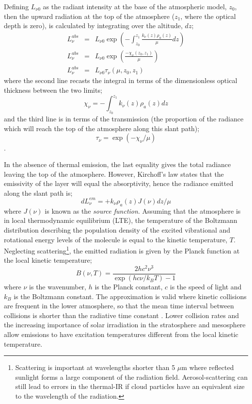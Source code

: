 \documentclass[final,5p,times,twocolumn,authoryear]{elsarticle}
\begin{document}
Defining $L_{\nu0}$ as the radiant intensity at the base of the atmospheric model, $z_0$, then the upward radiation at the top of the atmosphere ($z_1$, where the optical depth is zero), is calculated by integrating over the altitude, $dz$;
\begin{eqnarray}
L_{\nu}^{abs}&=&L_{\nu0}\exp\left(-\int_{z_0}^{z_1}\frac{k_\nu(z)\rho_a(z)}{\mu}dz\right) \\
L_{\nu}^{abs}&=&L_{\nu0}\exp\left(\frac{-\chi_\nu(z_0,z_1)}{\mu}\right) \\
L_{\nu}^{abs}&=&L_{\nu0}\tau_\nu(\mu,z_0,z_1)
\label{eq:abs_rad}
\end{eqnarray}
where the second line recasts the integral in terms of the dimensionless optical thickness between the two limits;
\begin{equation}
\chi_{\nu}=-\int_{z_0}^{z_1}k_\nu(z)\rho_a(z) dz
\end{equation}
and the third line is in terms of the transmission (the proportion of the radiance which will reach the top of the atmosphere along this slant path);
\begin{equation}
\tau_\nu=\exp(-\chi_\nu/\mu)
\end{equation}.

In the absence of thermal emission, the last equality gives the total radiance leaving the top of the atmosphere.  However, Kirchoff's law states that the emissivity of the layer will equal the absorptivity, hence the radiance emitted along the slant path is;
\begin{equation}
dL_{\nu}^{em}=+k_{\nu}\rho_a(z)J(\nu)dz/\mu
\label{eq:emm_rad}
\end{equation}
where $J(\nu)$ is known as the \textit{source function}.  Assuming that the atmosphere is in local thermodynamic equilibrium (LTE), the temperature of the Boltzmann distribution describing the population density of the excited vibrational and rotational energy levels of the molecule is equal to the kinetic temperature, $T$.  Neglecting scattering\footnote{Scattering is important at wavelengths shorter than 5 $\mu$m where reflected sunlight forms a large component of the radiation field.  Aerosol-scattering can still lead to errors in the thermal-IR if cloud particles have an equivalent size to the wavelength of the radiation.}, the emitted radiation is given by the Planck function at the local kinetic temperature;
\begin{equation}
B(\nu,T)=\frac{2hc^2\nu^3}{\exp(hc\nu/k_{B}T)-1}
\end{equation}
where $\nu$ is the wavenumber, $h$ is the Planck constant, $c$ is the speed of light and $k_B$ is the Boltzmann constant.  The approximation is valid where kinetic collisions are frequent in the lower atmosphere, so that the mean time interval between collisions is shorter than the radiative time constant \citep{00andrews}.  Lower collision rates and the increasing importance of solar irradiation in the stratosphere and mesosphere allow emissions to have excitation temperatures different from the local kinetic temperature.  
\end{document}
